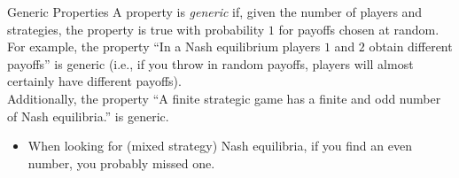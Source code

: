 \documentclass[8pt]{extarticle}
\begin{document}
  \begin{problem}{Generic Properties}
    A property is \textit{generic} if, given the number of players and strategies, the property is true with probability $1$ for payoffs chosen at random.\\

    For example, the property ``In a Nash equilibrium players $1$ and $2$ obtain different payoffs'' is generic (i.e., if you throw in random payoffs, players will almost certainly have different payoffs).\\

    Additionally, the property ``A finite strategic game has a finite and odd number of Nash equilibria.'' is generic.
    \begin{itemize}
      \item When looking for (mixed strategy) Nash equilibria, if you find an even number, you probably missed one.
    \end{itemize}
  \end{problem}
\end{document}
